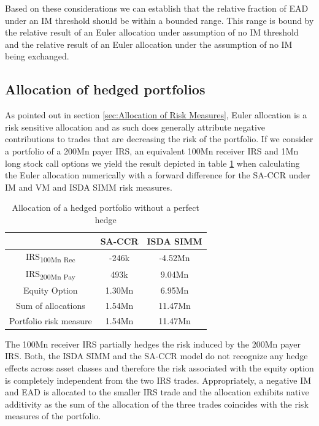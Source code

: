 \documentclass[../Thesis_AHoecherl.tex]{subfiles}
\begin{document}
    Based on these considerations we can establish that the relative fraction of \gls{EAD} under an \gls{IM} threshold should be within a bounded range. 
    This range is bound by the relative result of an Euler allocation under assumption of no \gls{IM} threshold and the relative result of an Euler allocation under the assumption of no \gls{IM} being exchanged.
    
    \subsection{Allocation of hedged portfolios\label{sec:Allocation of hedged portfolios}}
    
    As pointed out in section \ref{sec:Allocation of Risk Measures}, Euler allocation is a risk sensitive allocation and as such does generally attribute negative contributions to trades that are decreasing the risk of the portfolio. If we consider a portfolio of a 200Mn payer \gls{IRS}, an equivalent 100Mn receiver \gls{IRS} and 1Mn long stock call options we yield the result depicted in table \ref{tab:hedge trade sample results} when calculating the Euler allocation numerically with a forward difference for the \gls{SA-CCR} under \gls{IM} and \gls{VM} and \gls{ISDA SIMM} risk measures.
    \begin{table}[htbp]
        \centering
        \begin{tabular}{c|c|c}
            & \gls{SA-CCR} & \gls{ISDA SIMM} \\
            \toprule
            IRS\textsubscript{100Mn Rec} & -246k & -4.52Mn \\
            \midrule
            IRS\textsubscript{200Mn Pay} & 493k & 9.04Mn \\
            \midrule
            Equity Option & 1.30Mn & 6.95Mn \\
            \bottomrule
            Sum of allocations & 1.54Mn & 11.47Mn \\
            \midrule
            Portfolio risk measure & 1.54Mn & 11.47Mn \\
        \end{tabular}%
        \caption{Allocation of a hedged portfolio without a perfect hedge}
        \label{tab:hedge trade sample results}
    \end{table}
    The 100Mn receiver \gls{IRS} partially hedges the risk induced by the 200Mn payer \gls{IRS}. 
    Both, the \gls{ISDA SIMM} and the \gls{SA-CCR} model do not recognize any hedge effects across asset classes and therefore the risk associated with the equity option is completely independent from the two \gls{IRS} trades. 
    Appropriately, a negative \gls{IM} and \gls{EAD} is allocated to the smaller \gls{IRS} trade and the allocation exhibits native additivity as the sum of the allocation of the three trades coincides with the risk measures of the portfolio.
    
\end{document}
